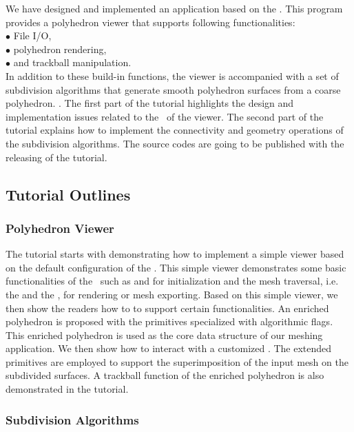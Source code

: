 \documentclass[letter,twocolumn]{article}
\begin{document}
We have designed and implemented an application based on the
\cgalpoly. This program provides a polyhedron viewer that supports
following functionalities:\\
\indent $\bullet$ File I/O,\\
\indent $\bullet$ polyhedron rendering,\\ 
\indent $\bullet$ and trackball manipulation.\\
In addition to these build-in functions, the viewer is accompanied
with a set of subdivision algorithms that generate smooth polyhedron
surfaces from a coarse polyhedron. . The first part of the tutorial
highlights the design and implementation issues related to the \poly\
of the viewer. The second part of the tutorial explains how to
implement the connectivity and geometry operations of the subdivision
algorithms. The source codes are going to be published with the
releasing of the tutorial.

\subsection*{Tutorial Outlines}
\subsubsection*{Polyhedron Viewer}

The tutorial starts with demonstrating how to implement a simple
viewer based on the default configuration of the \cgalpoly . This
simple viewer demonstrates some basic functionalities of the
\cgalpoly\ such as  and  
for initialization and the mesh traversal, i.e. the \italic{iterators}
and the \italic{circulators}, for rendering or mesh exporting. Based on
this simple viewer, we then show the readers how to
 to support certain functionalities. 
An enriched polyhedron is proposed with the primitives 
specialized with algorithmic flags. This enriched polyhedron
is used as the core data structure of our meshing application.
We then show how to interact with a customized \poly.
The extended primitives are employed to support the superimposition of the 
input mesh on the subdivided surfaces. A trackball function
of the enriched polyhedron is also demonstrated in the tutorial.

\subsubsection*{Subdivision Algorithms}
\end{document}
